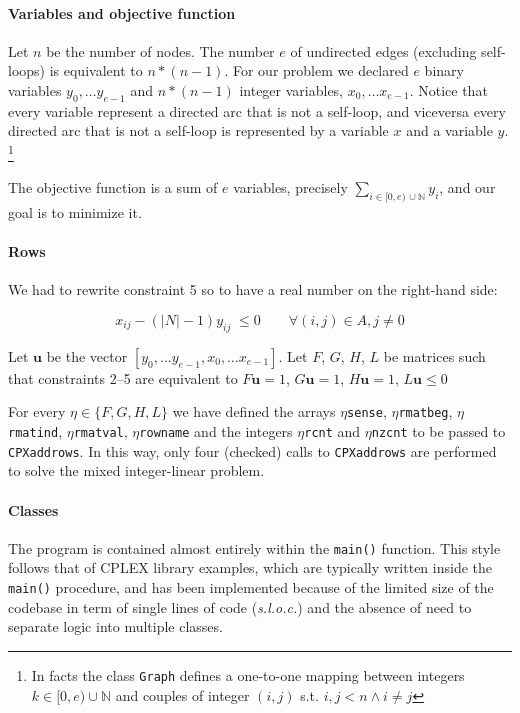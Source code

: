 \documentclass[../main.tex]{subfiles}
\begin{document}
\paragraph{Variables and objective function}
Let $n$ be the number of nodes. The number $e$ of undirected edges (excluding self-loops) is equivalent to $n*(n-1)$. For our problem we declared $e$ binary variables $y_0, \ldots y_{e-1}$ and $n*(n-1)$ integer variables, $x_0, \ldots x_{e-1}$. Notice that every variable represent a directed arc that is not a self-loop, and viceversa every directed arc that is not a self-loop is represented by a variable $x$ and a variable $y$. \footnote{In facts the class \texttt{Graph} defines a one-to-one mapping between integers $k \in [0,e) \cup \mathbb{N}$ and couples of integer $(i,j)$ s.t. $i,j < n \land i\neq j$}


The objective function is a sum of $e$ variables, precisely $\sum_{i \in [0,e)\,\cup \mathbb{N}} y_{i}$, and our goal is to minimize it.

\paragraph{Rows}
We had to rewrite constraint 5 so to have a real number on the right-hand side:

$$ x_{i j} -(|N| - 1) y_{i j} \; \leq 0 \qquad \forall (i,j) \in A, j \neq 0 $$

Let $\textbf{u}$ be the vector $[y_0, \ldots y_{e-1},x_0, \ldots x_{e-1}]$.
Let $F$, $G$, $H$, $L$ be matrices such that constraints 2--5 are equivalent to $F\textbf{u}=1$, $G\textbf{u}=1$, $H\textbf{u}=1$, $L\textbf{u} \leq 0$

For every $\eta \in \{F,G,H, L\}$ we have defined the arrays  $\eta$\texttt{sense}, $\eta$\texttt{rmatbeg}, $\eta$\texttt{rmatind}, $\eta$\texttt{rmatval}, $\eta$\texttt{rowname} and the integers $\eta$\texttt{rcnt} and $\eta$\texttt{nzcnt} to be passed to \texttt{CPXaddrows}.
In this way, only four (checked) calls to \texttt{CPXaddrows} are performed to solve the mixed integer-linear problem.
\paragraph{Classes}


The program is contained almost entirely within the \texttt{main()} function. This style follows that of CPLEX library examples, which are typically written inside the \texttt{main()} procedure, and has been implemented because of the limited size of the codebase in term of single lines of code (\textit{s.l.o.c.}) and the absence of need to separate logic into multiple classes.
\end{document}
